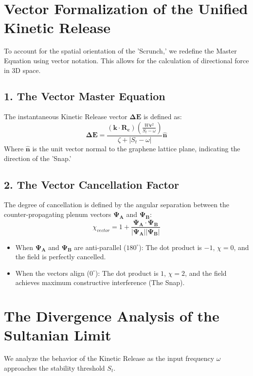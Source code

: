 \documentclass[11pt]{article}
\begin{document}
\section*{Vector Formalization of the Unified Kinetic Release}

To account for the spatial orientation of the 'Scrunch,' we redefine the Master Equation using vector notation. This allows for the calculation of directional force in 3D space.

\subsection*{1. The Vector Master Equation}
The instantaneous Kinetic Release vector $\mathbf{\Delta E}$ is defined as:
\begin{equation}
    \mathbf{\Delta E} = \frac{(\mathbf{k} \cdot \mathbf{R_c}) \left( \frac{W \mathbf{v}^2}{S_t - \omega} \right)}{\zeta + |S_t - \omega|} \mathbf{\hat{n}}
\end{equation}
Where $\mathbf{\hat{n}}$ is the unit vector normal to the graphene lattice plane, indicating the direction of the 'Snap.'

\subsection*{2. The Vector Cancellation Factor}
The degree of cancellation is defined by the angular separation between the counter-propagating plenum vectors $\mathbf{\Psi_A}$ and $\mathbf{\Psi_B}$:
\begin{equation}
    \chi_{vector} = 1 + \frac{\mathbf{\Psi_A} \cdot \mathbf{\Psi_B}}{|\mathbf{\Psi_A}| |\mathbf{\Psi_B}|}
\end{equation}
\begin{itemize}
    \item When $\mathbf{\Psi_A}$ and $\mathbf{\Psi_B}$ are anti-parallel ($180^\circ$): The dot product is $-1$, $\chi = 0$, and the field is perfectly cancelled.
    \item When the vectors align ($0^\circ$): The dot product is $1$, $\chi = 2$, and the field achieves maximum constructive interference (The Snap).
\end{itemize}

\section*{The Divergence Analysis of the Sultanian Limit}

We analyze the behavior of the Kinetic Release as the input frequency $\omega$ approaches the stability threshold $S_t$.
\end{document}
